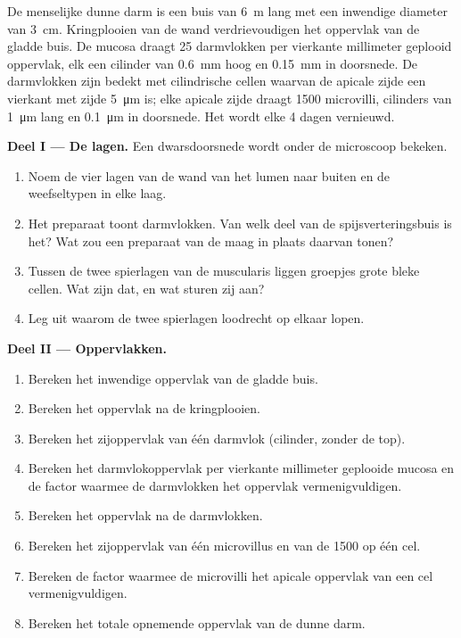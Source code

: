 \begin{problem}
\label{pb:b1:body-plans-tissues:1}
De menselijke dunne darm is een buis van \qty{6}{m} lang met een inwendige
diameter van \qty{3}{cm}. Kringplooien van de wand verdrievoudigen het oppervlak
van de gladde buis. De mucosa draagt \qty{25}{} darmvlokken per vierkante
millimeter geplooid oppervlak, elk een cilinder van \qty{0.6}{mm} hoog en
\qty{0.15}{mm} in doorsnede. De darmvlokken zijn bedekt met cilindrische cellen
waarvan de apicale zijde een vierkant met zijde \qty{5}{\micro m} is; elke
apicale zijde draagt \qty{1500}{} microvilli, cilinders van \qty{1}{\micro m}
lang en \qty{0.1}{\micro m} in doorsnede. Het  wordt elke \qty{4}{}
dagen vernieuwd.

\medskip
\noindent\textbf{Deel I --- De lagen.}
Een dwarsdoorsnede wordt onder de microscoop bekeken.
\begin{enumerate}
  \item Noem de vier lagen van de wand van het lumen naar buiten en de
        weefseltypen in elke laag.
  \item Het preparaat toont darmvlokken. Van welk deel van de
        spijsverteringsbuis is het? Wat zou een preparaat van de maag in
        plaats daarvan tonen?
  \item Tussen de twee spierlagen van de muscularis liggen groepjes grote
        bleke cellen. Wat zijn dat, en wat sturen zij aan?
  \item Leg uit waarom de twee spierlagen loodrecht op elkaar lopen.
\end{enumerate}

\medskip
\noindent\textbf{Deel II --- Oppervlakken.}
\begin{enumerate}[resume]
  \item Bereken het inwendige oppervlak van de gladde buis.
  \item Bereken het oppervlak na de kringplooien.
  \item Bereken het zijoppervlak van één darmvlok (cilinder, zonder de
        top).
  \item Bereken het darmvlokoppervlak per vierkante millimeter geplooide
        mucosa en de factor waarmee de darmvlokken het oppervlak
        vermenigvuldigen.
  \item Bereken het oppervlak na de darmvlokken.
  \item Bereken het zijoppervlak van één microvillus en van de
        \qty{1500}{} op één cel.
  \item Bereken de factor waarmee de microvilli het apicale oppervlak van
        een cel vermenigvuldigen.
  \item Bereken het totale opnemende oppervlak van de dunne darm.
\end{enumerate}


\end{problem}
